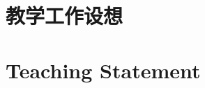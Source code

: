 \ifChinese

\section*{教学工作设想}

\zhlipsum[7-9]

\else  %

\section*{Teaching Statement}

\lipsum[7-9]

\fi  %
